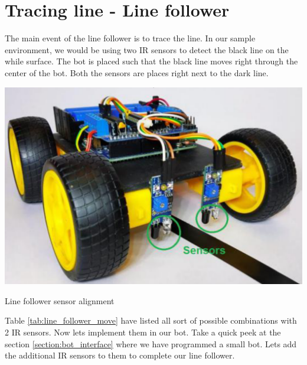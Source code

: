\section{Tracing line - Line follower}

The main event of the line follower is to trace the line. In our sample environment, we would be using two \ac{IR} sensors to detect the black line on the while surface. The bot is placed such that the black line moves right through the center of the bot. Both the sensors are places right next to the dark line.

\begin{marginfigure}
    \includegraphics{Images/IR Sensor/sensor_align.png}
     \caption[Line Follower Sensor]{Line follower sensor alignment}
\end{marginfigure}

Table \ref{tab:line_follower_move} have listed all sort of possible combinations with 2 \ac{IR} sensors. Now lets implement them in our bot. Take a quick peek at the section \ref{section:bot_interface} where we have programmed a small bot. Lets add the additional \ac{IR} sensors to them to complete our line follower.

